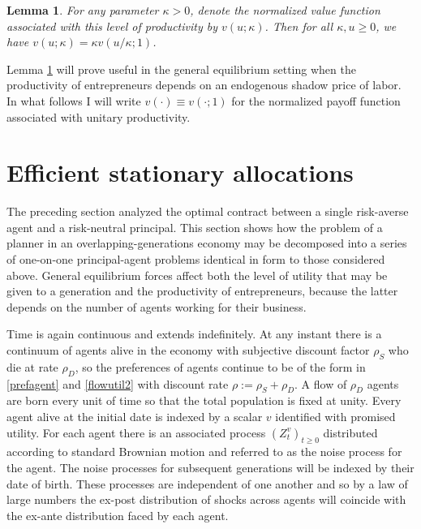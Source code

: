 \documentclass[11pt]{article}
\theoremstyle{plain}
\newtheorem{lemma}[thm]{Lemma}
\begin{document}
\begin{lemma} \label{scalehomog}
For any parameter $\kappa > 0$, denote the normalized value function associated with this level of productivity by $v(u;\kappa)$. Then for all $\kappa, u \geq0$, we have $v(u; \kappa) = \kappa v(u/\kappa; 1)$.
\end{lemma}

\noindent Lemma \ref{scalehomog} will prove useful in the general equilibrium setting when the productivity of entrepreneurs depends on an endogenous shadow price of labor. In what follows I will write $v(\cdot) \equiv v(\cdot;1)$ for the normalized payoff function associated with unitary productivity.

\section{Efficient stationary allocations} \label{GenEq}

The preceding section analyzed the optimal contract between a single risk-averse agent and a risk-neutral principal. This section shows how the problem of a planner in an overlapping-generations economy may be decomposed into a series of one-on-one principal-agent problems identical in form to those considered above. General equilibrium forces affect both the level of utility that may be given to a generation and the productivity of entrepreneurs, because the latter depends on the number of agents working for their business. 





Time is again continuous and extends indefinitely. At any instant there is a continuum of agents alive in the economy with subjective discount factor $\rho_S$ who die at rate $\rho_D$, so the preferences of agents continue to be of the form in \eqref{prefagent} and \eqref{flowutil2} with discount rate $\rho := \rho_S+\rho_D$. A flow of $\rho_D$ agents are born every unit of time so that the total population is fixed at unity. Every agent alive at the initial date is indexed by a scalar $v$ identified with promised utility. For each agent there is an associated process $(Z^v_t)_{t\geq0}$ distributed according to standard Brownian motion and referred to as the noise process for the agent. The noise processes for subsequent generations will be indexed by their date of birth. These processes are independent of one another and so by a law of large numbers the ex-post distribution of shocks across agents will coincide with the ex-ante distribution faced by each agent. 
\end{document}
